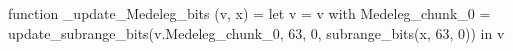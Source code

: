function _update_Medeleg_bits (v, x) = let v = { v with Medeleg_chunk_0 = update_subrange_bits(v.Medeleg_chunk_0, 63, 0, subrange_bits(x, 63, 0)) } in
  v
